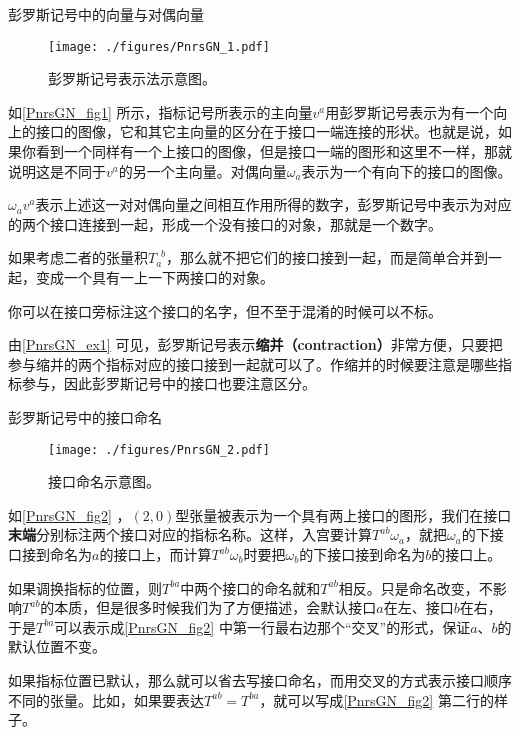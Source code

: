 \begin{example}{彭罗斯记号中的向量与对偶向量}\label{PnrsGN_ex1}


\begin{figure}[ht]
\centering
\texttt{[image: ./figures/PnrsGN\_1.pdf]}
\caption{彭罗斯记号表示法示意图。} \label{PnrsGN_fig1}
\end{figure}


如\autoref{PnrsGN_fig1} 所示，指标记号所表示的主向量$v^a$用彭罗斯记号表示为有一个向上的接口的图像，它和其它主向量的区分在于接口一端连接的形状。也就是说，如果你看到一个同样有一个上接口的图像，但是接口一端的图形和这里不一样，那就说明这是不同于$v^a$的另一个主向量。对偶向量$\omega_a$表示为一个有向下的接口的图像。

$\omega_av^a$表示上述这一对对偶向量之间相互作用所得的数字，彭罗斯记号中表示为对应的两个接口连接到一起，形成一个没有接口的对象，那就是一个数字。

如果考虑二者的张量积$T_a^{\phantom{1}b}$，那么就不把它们的接口接到一起，而是简单合并到一起，变成一个具有一上一下两接口的对象。

你可以在接口旁标注这个接口的名字，但不至于混淆的时候可以不标。

\end{example}


由\autoref{PnrsGN_ex1} 可见，彭罗斯记号表示\textbf{缩并（contraction）}非常方便，只要把参与缩并的两个指标对应的接口接到一起就可以了。作缩并的时候要注意是哪些指标参与，因此彭罗斯记号中的接口也要注意区分。



\begin{example}{彭罗斯记号中的接口命名}

\begin{figure}[ht]
\centering
\texttt{[image: ./figures/PnrsGN\_2.pdf]}
\caption{接口命名示意图。} \label{PnrsGN_fig2}
\end{figure}

如\autoref{PnrsGN_fig2} ，$(2, 0)$型张量被表示为一个具有两上接口的图形，我们在接口\textbf{末端}分别标注两个接口对应的指标名称。这样，入宫要计算$T^{ab}\omega_{a}$，就把$\omega_{a}$的下接口接到命名为$a$的接口上，而计算$T^{ab}\omega_{b}$时要把$\omega_b$的下接口接到命名为$b$的接口上。

如果调换指标的位置，则$T^{ba}$中两个接口的命名就和$T^{ab}$相反。只是命名改变，不影响$T^{ab}$的本质，但是很多时候我们为了方便描述，会默认接口$a$在左、接口$b$在右，于是$T^{ba}$可以表示成\autoref{PnrsGN_fig2} 中第一行最右边那个“交叉”的形式，保证$a$、$b$的默认位置不变。

如果指标位置已默认，那么就可以省去写接口命名，而用交叉的方式表示接口顺序不同的张量。比如，如果要表达$T^{ab}=T^{ba}$，就可以写成\autoref{PnrsGN_fig2} 第二行的样子。

\end{example}



